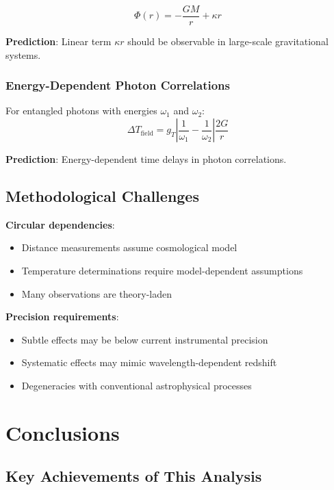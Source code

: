 \documentclass[12pt,a4paper]{article}
\begin{document}
	\begin{equation}
		\Phi(r) = -\frac{GM}{r} + \kappa r
	\end{equation}
	
	\textbf{Prediction}: Linear term $\kappa r$ should be observable in large-scale gravitational systems.
	
	\subsubsection{Energy-Dependent Photon Correlations}
	\label{subsubsec:photon_correlations}
	
	For entangled photons with energies $\omega_1$ and $\omega_2$:
	\begin{equation}
		\Delta T_{\text{field}} = g_T \left|\frac{1}{\omega_1} - \frac{1}{\omega_2}\right| \frac{2G}{r}
	\end{equation}
	
	\textbf{Prediction}: Energy-dependent time delays in photon correlations.
	
	\subsection{Methodological Challenges}
	\label{subsec:methodological_challenges}
	
	\textbf{Circular dependencies}:
	\begin{itemize}
		\item Distance measurements assume cosmological model
		\item Temperature determinations require model-dependent assumptions
		\item Many observations are theory-laden
	\end{itemize}
	
	\textbf{Precision requirements}:
	\begin{itemize}
		\item Subtle effects may be below current instrumental precision
		\item Systematic effects may mimic wavelength-dependent redshift
		\item Degeneracies with conventional astrophysical processes
	\end{itemize}
	
	\section{Conclusions}
	\label{sec:conclusions}
	
	\subsection{Key Achievements of This Analysis}
	\label{subsec:key_achievements}
	
\end{document}
